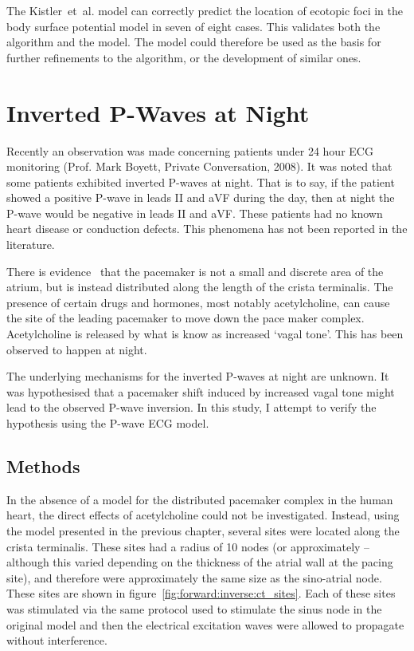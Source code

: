 The Kistler~et~al. model can correctly predict the location of ecotopic foci in
the body surface potential model in seven of eight cases.
This validates both the algorithm and the model.
The model could therefore be used as the basis for further refinements to the
algorithm, or the development of similar ones.

\section{Inverted P-Waves at Night}

Recently an observation was made concerning patients under
24 hour ECG monitoring (Prof. Mark Boyett, Private Conversation, 2008).
It was noted that some patients exhibited inverted P-waves at night.
That is to say, if the patient showed a positive P-wave in leads II and aVF
during the day, then at night the P-wave would be negative in leads II and aVF.
These patients had no known heart disease or conduction defects.
This phenomena has not been reported in the literature.

There is evidence~\cite{Shibata2001,Boineau1988,Dobrzynski2005} that the pacemaker is not a
small and discrete area of the atrium, but is instead distributed along the
length of the crista terminalis.
The presence of certain drugs and hormones, most notably acetylcholine, can cause
the site of the leading pacemaker to move down the pace maker complex.
Acetylcholine is released by what is know as increased `vagal tone'.
This has been observed to happen at night.

The underlying mechanisms for the inverted P-waves at night are unknown.
It was hypothesised that a pacemaker shift induced by increased vagal tone
might lead to the observed P-wave inversion.
In this study, I attempt to verify the hypothesis using the P-wave ECG model.


\subsection{Methods}

In the absence of a model for the distributed pacemaker complex in the human
heart, the direct effects of acetylcholine could not be investigated.
Instead, using the model presented in the previous chapter, several sites were
located along the crista terminalis.
These sites had a radius of 10 nodes (or approximately --although this
varied depending on the thickness of the atrial wall at the pacing site), and
therefore were approximately the same size as the sino-atrial node.
These sites are shown in figure~\ref{fig:forward:inverse:ct_sites}.
Each of these sites was stimulated via the same protocol used to stimulate the
sinus node in the original model and then the electrical excitation waves were
allowed to propagate without interference.

